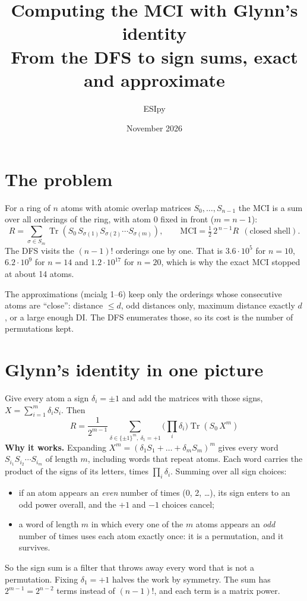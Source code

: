 \documentclass[11pt,a4paper]{article}
\title{Computing the MCI with Glynn's identity\\[2pt]\large From the DFS to sign sums, exact and approximate}
\author{ESIpy}
\date{November 2026}
\begin{document}
\maketitle

\section{The problem}
For a ring of $n$ atoms with atomic overlap matrices $S_0,\dots,S_{n-1}$ the MCI is a sum over all orderings of the ring,
with atom 0 fixed in front ($m=n-1$):
\[
R=\sum_{\sigma\in S_m}\operatorname{Tr}\left(S_0\,S_{\sigma(1)}S_{\sigma(2)}\cdots S_{\sigma(m)}\right),
\qquad \text{MCI}=\tfrac12\,2^{\,n-1}R \ \ (\text{closed shell}).
\]
The DFS visits the $(n-1)!$ orderings one by one. That is $3.6\cdot 10^{5}$ for $n=10$, $6.2\cdot10^{9}$ for $n=14$
and $1.2\cdot10^{17}$ for $n=20$, which is why the exact MCI stopped at about 14 atoms.

The approximations (mcialg 1--6) keep only the orderings whose consecutive atoms are ``close'': distance $\le d$, odd
distances only, maximum distance exactly $d$, or a large enough DI. The DFS enumerates those, so its cost is the number of
permutations kept.

\section{Glynn's identity in one picture}
Give every atom a sign $\delta_i=\pm1$ and add the matrices with those signs, $X=\sum_{i=1}^{m}\delta_i S_i$. Then
\[
\boxed{\;R=\frac{1}{2^{m-1}}\sum_{\delta\in\{\pm1\}^m,\ \delta_1=+1}\Big(\prod_{i}\delta_i\Big)\operatorname{Tr}\left(S_0\,X^{m}\right)\;}
\]
\textbf{Why it works.} Expanding $X^m=(\delta_1S_1+\dots+\delta_mS_m)^m$ gives every word $S_{i_1}S_{i_2}\cdots S_{i_m}$ of
length $m$, including words that repeat atoms. Each word carries the product of the signs of its letters, times
$\prod_i\delta_i$. Summing over all sign choices:
\begin{itemize}\itemsep0pt
\item if an atom appears an \emph{even} number of times (0, 2, \dots), its sign enters to an odd power overall, and the
      $+1$ and $-1$ choices cancel;
\item a word of length $m$ in which every one of the $m$ atoms appears an \emph{odd} number of times uses each atom exactly
      once: it is a permutation, and it survives.
\end{itemize}
So the sign sum is a filter that throws away every word that is not a permutation. Fixing $\delta_1=+1$ halves the work by
symmetry. The sum has $2^{m-1}=2^{n-2}$ terms instead of $(n-1)!$, and each term is a matrix power.
\end{document}
